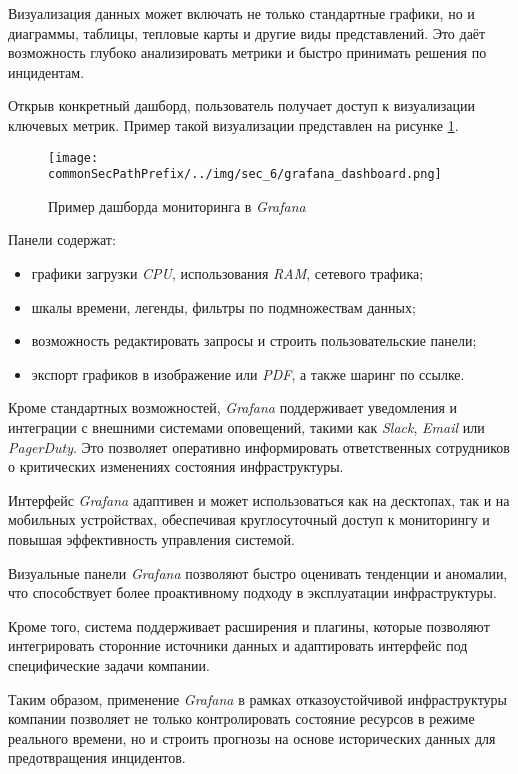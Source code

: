 Визуализация данных может включать не только стандартные графики, но и диаграммы, таблицы, тепловые карты и другие виды представлений. Это даёт возможность глубоко анализировать метрики и быстро принимать решения по инцидентам.

Открыв конкретный дашборд, пользователь получает доступ к визуализации ключевых метрик. Пример такой визуализации представлен на рисунке \ref{fig:user_guide:grafana_dashboard}.

\begin{figure}[ht]
    \centering
    \texttt{[image: \\commonSecPathPrefix/../img/sec\_6/grafana\_dashboard.png]}
    \caption{Пример дашборда мониторинга в \textit{Grafana}}
    \label{fig:user_guide:grafana_dashboard}
\end{figure}

Панели содержат:
\begin{itemize}
    \item графики загрузки \textit{CPU}, использования \textit{RAM}, сетевого трафика;
    \item шкалы времени, легенды, фильтры по подмножествам данных;
    \item возможность редактировать запросы и строить пользовательские панели;
    \item экспорт графиков в изображение или \textit{PDF}, а также шаринг по ссылке.
\end{itemize}

Кроме стандартных возможностей, \textit{Grafana} поддерживает уведомления и интеграции с внешними системами оповещений, такими как \textit{Slack}, \textit{Email} или \textit{PagerDuty}. Это позволяет оперативно информировать ответственных сотрудников о критических изменениях состояния инфраструктуры.

Интерфейс \textit{Grafana} адаптивен и может использоваться как на десктопах, так и на мобильных устройствах, обеспечивая круглосуточный доступ к мониторингу и повышая эффективность управления системой.

Визуальные панели \textit{Grafana} позволяют быстро оценивать тенденции и аномалии, что способствует более проактивному подходу в эксплуатации инфраструктуры.

Кроме того, система поддерживает расширения и плагины, которые позволяют интегрировать сторонние источники данных и адаптировать интерфейс под специфические задачи компании.

Таким образом, применение \textit{Grafana} в рамках отказоустойчивой инфраструктуры компании позволяет не только контролировать состояние ресурсов в режиме реального времени, но и строить прогнозы на основе исторических данных для предотвращения инцидентов.


